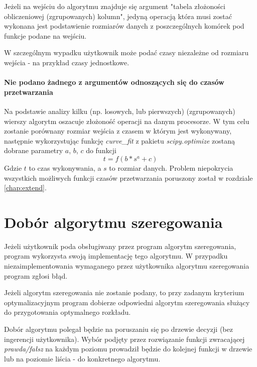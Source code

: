 \documentclass[brudnopis]{xmgr}
\begin{document}
Jeżeli na wejściu do algorytmu znajduje się argument "tabela złożoności obliczeniowej (zgrupowanych) kolumn", jedyną operacją która musi zostać wykonana jest podstawienie rozmiarów danych z poszczególnych komórek pod funkcje podane na wejściu.

W szczególnym wypadku użytkownik może podać czasy niezależne od rozmiaru wejścia - na przykład czasy jednostkowe.

\paragraph{Nie podano żadnego z argumentów odnoszących się do czasów przetwarzania}

Na podstawie analizy kilku (np. losowych, lub pierwszych) (zgrupowanych) wierszy algorytm oszacuje złożoność operacji na danym procesorze.
W tym celu zostanie porównany rozmiar wejścia z czasem w którym jest wykonywany, następnie wykorzystując funkcję \emph{curve\_fit} z pakietu \emph{scipy.optimize} zostaną dobrane parametry $a$, $b$, $c$ do funkcji
$$t = f(b * s^a + c)$$
Gdzie $t$ to czas wykonywania, a $s$ to rozmiar danych.
Problem niepokrycia wszystkich możliwych funkcji czasów przetwarzania poruszony został w rozdziale \ref{chap:extend}.


\section{Dobór algorytmu szeregowania}


Jeżeli użytkownik poda obsługiwany przez program algorytm szeregowania, program wykorzysta swoją implementację tego algorytmu.
W przypadku niezaimplementowania wymaganego przez użytkownika algorytmu szeregowania program zgłosi błąd.

Jeżeli algorytm szeregowania nie zostanie podany, to przy zadanym kryterium optymalizacyjnym program dobierze odpowiedni algorytm szeregowania służący do przygotowania optymalnego rozkładu.

Dobór algorytmu polegał będzie na poruszaniu się po drzewie decyzji (bez ingerencji użytkownika).
Wybór podjęty przez rozwiązanie funkcji zwracającej \emph{prawda/fałsz} na każdym poziomu prowadził będzie do kolejnej funkcji w drzewie lub na poziomie liścia - do konkretnego algorytmu.
\end{document}
